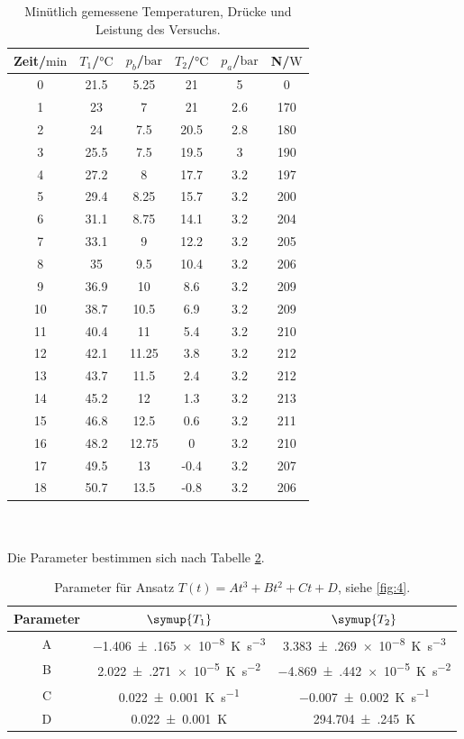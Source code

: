 \begin{table}
  \centering
  \caption{Minütlich gemessene Temperaturen, Drücke und Leistung des Versuchs.}
  \label{tab:6}
  \begin{tabular}{c c c c c c}
    \toprule
    Zeit/$\si{\minute}$ & $T_1$/$\si{\celsius}$ & $p_b$/$\si{\bar}$ &
    $T_2$/$\si{\celsius}$ & $p_a$/$\si{\bar}$ & N/$\si{\watt}$ \\
    \midrule
    0 & 21.5 & 5.25 & 21 & 5 & 0 \\
    1 & 23 & 7 & 21 & 2.6 & 170 \\
    2 & 24 & 7.5 & 20.5 & 2.8 & 180 \\
    3 & 25.5 & 7.5 & 19.5 & 3 & 190 \\
    4 & 27.2 & 8 & 17.7 & 3.2 & 197 \\
    5 & 29.4 & 8.25 & 15.7 & 3.2 & 200 \\
    6 & 31.1 & 8.75 & 14.1 & 3.2 & 204 \\
    7 & 33.1 & 9 & 12.2 & 3.2 & 205 \\
    8 & 35 & 9.5 & 10.4 & 3.2 & 206 \\
    9  & 36.9 & 10   & 8.6 & 3.2 & 209 \\
    10 & 38.7 & 10.5 & 6.9 & 3.2 & 209 \\
    11 & 40.4 & 11   & 5.4 & 3.2 & 210 \\
    12 & 42.1 & 11.25 & 3.8 & 3.2 & 212 \\
    13 & 43.7 & 11.5 & 2.4 & 3.2 & 212 \\
    14 & 45.2 & 12   & 1.3 & 3.2 & 213 \\
    15 & 46.8 & 12.5 & 0.6 & 3.2 & 211 \\
    16 & 48.2 & 12.75 & 0 & 3.2 & 210 \\
    17 & 49.5 & 13 & -0.4 & 3.2 & 207 \\
    18 & 50.7 & 13.5 & -0.8 & 3.2 & 206 \\
    \bottomrule
  \end{tabular}
\end{table}
\\
\\
Die Parameter bestimmen sich nach Tabelle \ref{tab:1}.
\begin{table}[h]
  \centering
  \caption{Parameter für Ansatz $T(t) = At^3 + Bt^2 + Ct + D$, siehe  \ref{fig:4}.}
  \label{tab:1}
  \begin{tabular}{c c c}
    \toprule
    Parameter & $\symup{T_1}$ & $\symup{T_2}$ \\
    \midrule
    A & \SI{-1.406(165)e-8}{\kelvin\per\cubic\second} & \SI{3.383(269)e-8}{\kelvin\per\cubic\second} \\
    B & \SI{2.022(271)e-5}{\kelvin\per\second\squared} & \SI{-4.869(442)e-5}{\kelvin\per\second\squared} \\
    C & \SI{0.022(1)}{\kelvin\per\second} & \SI{-0.007(2)}{\kelvin\per\second} \\
    D & \SI{0.022(1)}{\kelvin} & \SI{294.704(245)}{\kelvin} \\
    \bottomrule
  \end{tabular}
\end{table}
